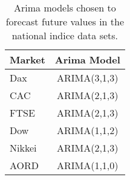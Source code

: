 \begin{table}[ht]
\centering
\caption[Arima models chosen for the indice data sets]{Arima models chosen to forecast future values in the national indice data sets.} 
\label{tab:chp_ts_arima_models}
\begin{tabular}{lc}
  \toprule Market & Arima Model \\ 
  \midrule Dax & ARIMA(3,1,3)                    \\ 
  CAC & ARIMA(2,1,3)                    \\ 
  FTSE & ARIMA(2,1,3)                    \\ 
  Dow & ARIMA(1,1,2)                    \\ 
  Nikkei & ARIMA(2,1,3)                    \\ 
  AORD & ARIMA(1,1,0)                    \\ 
   \bottomrule \end{tabular}
\end{table}

